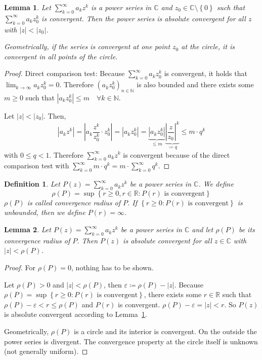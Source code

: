 \documentclass[a4paper,landscape,twocolumn]{article}
\newtheorem{defi}{Definition}
\newtheorem{lemma}{Lemma}
\newcommand\set[1]{\left\{#1\right\}}
\newcommand\abs[1]{\left|#1\right|}
\begin{document}
\begin{lemma}
  \label{series-absolute-conv}
  Let $\sum_{k=0}^\infty a_k z^k$ is a power series in $\mathbb C$ and $z_0 \in \mathbb C \setminus \set{0}$
  such that $\sum_{k=0}^\infty a_k z_0^k$ is convergent. Then the power series is
  absolute convergent for all $z$ with $\abs{z} < \abs{z_0}$.

  Geometrically, if the series is convergent at one point $z_0$ at the circle,
  it is convergent in all points of the circle.
\end{lemma}
\begin{proof}
  Direct comparison test: Because $\sum_{k=0}^\infty a_k z_0^k$ is convergent,
  it holds that $\lim_{k\to\infty} a_k z_0^k = 0$.
  Therefore $(a_k z_0^k)_{n\in\mathbb N}$ is also bounded and there exists some
  $m \geq 0$ such that $\abs{a_k z_0^k} \leq m \quad \forall k \in \mathbb N$.

  Let $\abs{z} < \abs{z_0}$. Then,
  \[
    \abs{a_k z^k}
    = \abs{a_k \frac{z^k}{z_0^k} \cdot z_0^k}
    = \abs{a_k z_0^k}
    = \underbrace{\abs{a_k z_0^k}}_{\leq m} \underbrace{\abs{\frac{z}{z_0}}^k}_{\coloneqq q}
    \leq m \cdot q^k
  \]
  with $0 \leq q < 1$. Therefore $\sum_{k=0}^\infty a_k z^k$ is convergent
  because of the direct comparison test with $\sum_{k=0}^\infty m \cdot q^k = m \cdot \sum_{k=0}^\infty q^k$.
\end{proof}
\begin{defi}
  Let $P(z) = \sum_{k=0}^\infty a_k z^k$ be a power series in $\mathbb C$. We define
  \[ \rho(P) = \sup\set{r \geq 0, r \in \mathbb R: P(r) \text{ is convergent}} \]
  $\rho(P)$ is called convergence radius of $P$. If $\set{r \geq 0: P(r) \text{ is convergent}}$
  is unbounded, then we define $P(r) = \infty$.
\end{defi}

\begin{lemma}
  Let $P(z) = \sum_{k=0}^\infty a_k z^k$ be a power series in $\mathbb C$ and
  let $\rho(P)$ be its convergence radius of $P$. Then $P(z)$ is absolute convergent
  for all $z \in \mathbb C$ with $\abs{z} < \rho(P)$.
\end{lemma}
\begin{proof}
  For $\rho(P) = 0$, nothing has to be shown.

  Let $\rho(P) > 0$ and $\abs{z} < \rho(P)$, then $\varepsilon \coloneqq \rho(P) - \abs{z}$.
  Because $\rho(P) = \sup\set{r \geq 0: P(r) \text{ is convergent}}$, there exists some
  $r \in \mathbb R$ such that $\rho(P) - \varepsilon < r \leq \rho(P)$ and $P(r)$ is convergent.
  $\rho(P) - \varepsilon = \abs{z} < r$. So $P(z)$ is absolute convergent
  according to Lemma~\ref{series-absolute-conv}.

  Geometrically, $\rho(P)$ is a circle and its interior is convergent.
  On the outside the power series is divergent. The convergence property
  at the circle itself is unknown (not generally uniform).
\end{proof}
\end{document}
